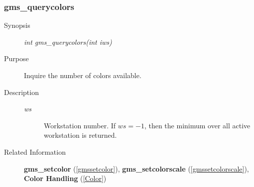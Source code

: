 \subsubsection{gms\_querycolors\label{gmsquerycolors}}
\begin{description}
\item[Synopsis]\mbox{}


{\em int   gms\_querycolors(int iws)\/}
\item[Purpose]\mbox{}


Inquire the number of colors available.
\item[Description]\mbox{}


\begin{description}
\item[{\em ws\/}]\mbox{}

 Workstation number.
If $ws=-1$, then the minimum over all active
workstation is returned.
\end{description}

\item[Related Information]\mbox{}


{\bf gms\_setcolor} (\ref{gmssetcolor}), 
{\bf gms\_setcolorscale} (\ref{gmssetcolorscale}), 
{\bf Color Handling} (\ref{Color})
\end{description}



\newpage



